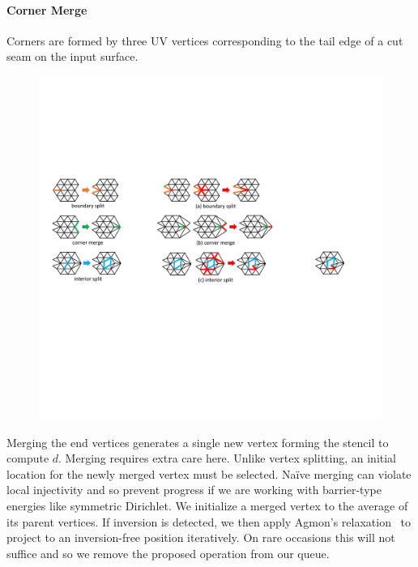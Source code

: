 \paragraph{Corner Merge}
Corners are formed by three UV vertices corresponding to the tail edge of a cut seam on the input surface. 
\begin{figure}
  \begin{center}
  \vspace{-5mm}
    \includegraphics[width=1\linewidth]{fig/cMerge}
  \vspace{-4mm}
  \end{center}
\end{figure}
Merging the end vertices generates a single new vertex forming the stencil to compute $d$. Merging requires extra care here. Unlike vertex splitting, an initial location for the newly merged vertex must be selected. Na\"ive merging can violate local injectivity and so prevent progress if we are working with barrier-type energies like symmetric Dirichlet. We initialize a merged vertex to the average of its parent vertices. If inversion is detected, we then apply Agmon's relaxation~ to project to an inversion-free position iteratively. On rare occasions this will not suffice and so we remove the proposed operation from our queue.

